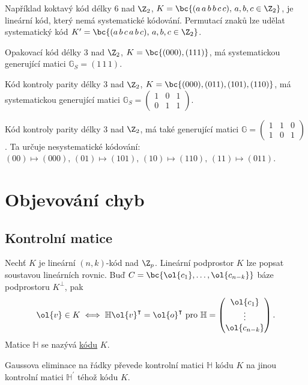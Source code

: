 Například koktavý kód délky 6 nad $\Z_2$, $K = \bc{(a\, a\, b\, b\, c\, c), \, a,b,c \in \Z_2}$, je lineární kód, který nemá systematické kódování. Permutací znaků lze udělat systematický kód $K^\prime = \bc{(a\, b\, c \, a\, b\, c), \, a,b,c \in \Z_2}$.

Opakovací kód délky 3 nad $\Z_2$, $K = \bc{(000), (111)}$, má systematickou generující matici $\mathbb{G}_S = (1 \, 1 \, 1)$.

Kód kontroly parity délky 3 nad $\Z_2$, $K = \bc{(000), (011), (101), (110)}$, má systematickou generující matici $\mathbb{G}_S = \begin{pmatrix}1 & 0 & 1\\ 0 & 1 & 1\end{pmatrix}$.

Kód kontroly parity délky 3 nad $\Z_2$, má také generující matici $\mathbb{G} = \begin{pmatrix}1 & 1 & 0 \\ 1 & 0 & 1 \end{pmatrix}$. Ta určuje nesystematické kódování: $(00) \mapsto (000), \, (01) \mapsto (101), \, (10) \mapsto (110), \, (11) \mapsto (011)$.

\section*{Objevování chyb}
\subsection{Kontrolní matice}\label{kontMat}
Nechť $K$ je lineární $(n,k)$-kód nad $\Z_p$. Lineární podprostor $K$ lze popsat soustavou lineárních rovnic. Buď $C = \bc{\ol{c_1}, \dots, \ol{c_{n-k}}}$ báze podprostoru $K^\perp$, pak
\begin{equation}
	\ol{v} \in K \iff \mathbb{H}\ol{v}^\intercal = \ol{o}^\intercal \text{ pro } \mathbb{H} = \begin{pmatrix}\ol{c_1} \\ \vdots \\ \ol{c_{n-k}}\end{pmatrix}.
\end{equation}
Matice $\mathbb{H}$ se nazývá  \hyperref[kod]{kódu} $K$.

Gaussova eliminace na řádky převede kontrolní matici $\mathbb{H}$ kódu $K$ na jinou kontrolní matici $\mathbb{H}^\prime$ téhož kódu $K$.

